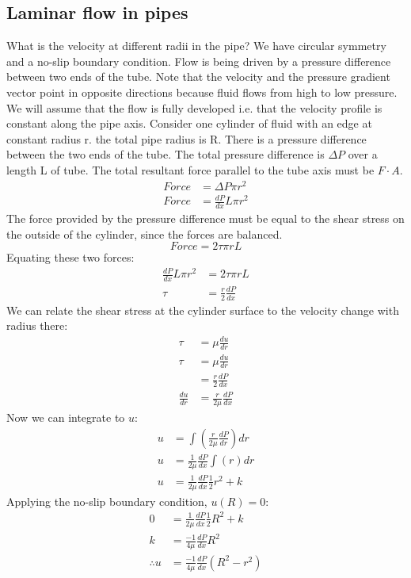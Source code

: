 \documentclass[class=report, crop=false, 12pt,a4paper]{standalone}
\begin{document}
\subsection{Laminar flow in pipes}
What is the velocity at different radii in the pipe? We have circular symmetry and a no-slip boundary condition. Flow is being driven by a pressure difference between two ends of the tube. Note that the velocity and the pressure gradient vector point in opposite directions because fluid flows from high to low pressure. We will assume that the flow is fully developed i.e. that the velocity profile is constant along the pipe axis. Consider one cylinder of fluid with an edge at constant radius r. the total pipe radius is R. There is a pressure difference between the two ends of the tube. The total pressure difference is \(\Delta P\) over a length L of tube. The total resultant force parallel to the tube axis must be \(F\cdot A\).
\begin{align*}
  Force &= \Delta P \pi r^2\\
  Force &= \frac{dP}{dx}L\pi r^2
\end{align*}
The force provided by the pressure difference must be equal to the shear stress on the outside of the cylinder, since the forces are balanced.
\[ Force = 2\tau \pi r L \]
Equating these two forces:
\begin{align*}
  \frac{dP}{dx}L\pi r^2 &= 2\tau \pi r L\\
  \tau &= \frac{r}{2} \frac{dP}{dx}
\end{align*}
We can relate the shear stress at the cylinder surface to the velocity change with radius there:
\begin{align*}
  \tau &= \mu \frac{du}{dr}\\
  \tau &= \mu \frac{du}{dr}\\
  &= \frac{r}{2} \frac{dP}{dx}\\
  \frac{du}{dr} &= \frac{r}{2\mu} \frac{dP}{dx}
\end{align*}
Now we can integrate to \(u\):
\begin{align*}
  u &= \int \left( \frac{r}{2\mu} \frac{dP}{dr} \right) dr\\
  u &= \frac{1}{2\mu} \frac{dP}{dx} \int (r) dr\\
  u &= \frac{1}{2\mu} \frac{dP}{dx} \frac{1}{2}r^2 +k
\end{align*}
Applying the no-slip boundary condition, \( u(R) = 0\):
\begin{align*}
  0 &= \frac{1}{2\mu} \frac{dP}{dx} \frac{1}{2} R^2 + k\\
  k &= \frac{-1}{4\mu} \frac{dP}{dx} R^2 \\
  \therefore u &= \frac{-1}{4\mu}\frac{dP}{dx}(R^2 - r^2)
\end{align*}
\end{document}
